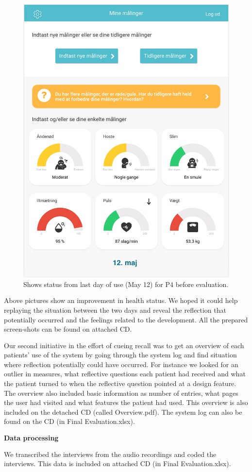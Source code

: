 \begin{figure}[h]
\begin{minipage}[b]{0.45\textwidth}
    \includegraphics[width=\textwidth]{images/study3/Gunnar22.png}
    \caption{Shows status from last day of use (May 12) for P4 before evaluation.}
    \label{fig:gunnar22}
  \end{minipage}
\end{figure}

Above pictures show an improvement in health status. We hoped it could help replaying the situation between the two days and reveal the reflection that potentially occurred and the feelings related to the development.
All the prepared screen-shots can be found on attached CD.

Our second initiative in the effort of cueing recall was to get an overview of each patients' use of the system by going through the system log and find situation where reflection potentially could have occurred. For instance we looked for an outlier in measures, what reflective questions each patient had received and what the patient turned to when the reflective question pointed at a design feature. The overview also included basic information as number of entries, what pages the user had visited and what features the patient had used. This overview is also included on the detached CD (called Overview.pdf). The system log can also be found on the CD (in Final Evaluation.xlsx).


\textbf{Data processing}

We transcribed the interviews from the audio recordings and coded the interviews. This data is included on attached CD (in Final Evaluation.xlsx).
